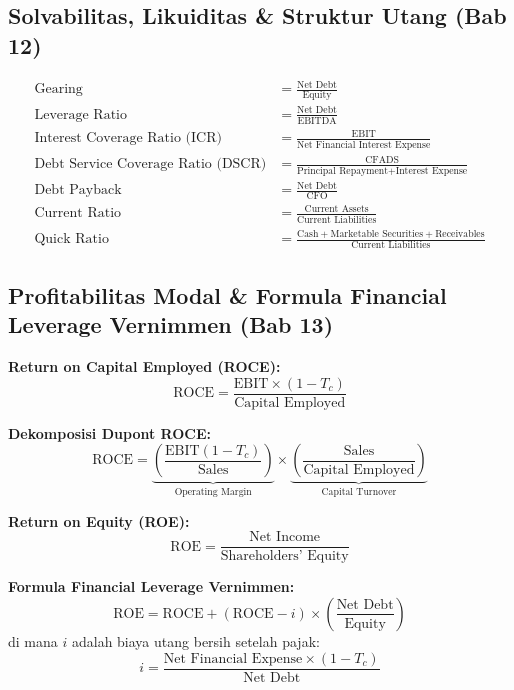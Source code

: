 \documentclass[10pt,a4paper]{article}
\begin{document}
\subsection{Solvabilitas, Likuiditas \& Struktur Utang (Bab 12)}

\begin{align}
\text{Gearing} &= \frac{\text{Net Debt}}{\text{Equity}} \\
\text{Leverage Ratio} &= \frac{\text{Net Debt}}{\text{EBITDA}} \\
\text{Interest Coverage Ratio (ICR)} &= \frac{\text{EBIT}}{\text{Net Financial Interest Expense}} \\
\text{Debt Service Coverage Ratio (DSCR)} &= \frac{\text{CFADS}}{\text{Principal Repayment} + \text{Interest Expense}} \\
\text{Debt Payback} &= \frac{\text{Net Debt}}{\text{CFO}} \\
\text{Current Ratio} &= \frac{\text{Current Assets}}{\text{Current Liabilities}} \\
\text{Quick Ratio} &= \frac{\text{Cash} + \text{Marketable Securities} + \text{Receivables}}{\text{Current Liabilities}}
\end{align}

\subsection{Profitabilitas Modal \& Formula Financial Leverage Vernimmen (Bab 13)}

\textbf{Return on Capital Employed (ROCE):}
\begin{equation}
\text{ROCE} = \frac{\text{EBIT} \times (1 - T_c)}{\text{Capital Employed}}
\end{equation}

\textbf{Dekomposisi Dupont ROCE:}
\begin{equation}
\text{ROCE} = \underbrace{\left(\frac{\text{EBIT}(1 - T_c)}{\text{Sales}}\right)}_{\text{Operating Margin}} \times \underbrace{\left(\frac{\text{Sales}}{\text{Capital Employed}}\right)}_{\text{Capital Turnover}}
\end{equation}

\textbf{Return on Equity (ROE):}
\begin{equation}
\text{ROE} = \frac{\text{Net Income}}{\text{Shareholders' Equity}}
\end{equation}

\textbf{Formula Financial Leverage Vernimmen:}
\begin{equation}
\boxed{\text{ROE} = \text{ROCE} + (\text{ROCE} - i) \times \left(\frac{\text{Net Debt}}{\text{Equity}}\right)}
\end{equation}
di mana $i$ adalah biaya utang bersih setelah pajak:
\begin{equation}
i = \frac{\text{Net Financial Expense} \times (1 - T_c)}{\text{Net Debt}}
\end{equation}
\end{document}
